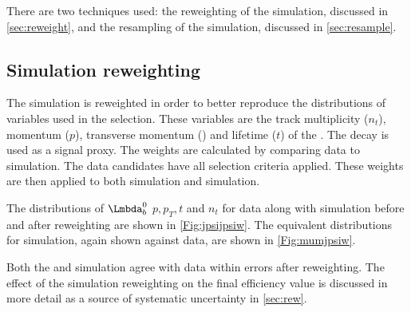 There are two techniques used: the reweighting of the simulation, discussed in \autoref{sec:reweight}, and the resampling of the simulation, discussed in \autoref{sec:resample}.

\subsection{Simulation reweighting}
\label{sec:reweight}
The simulation is reweighted in order to better reproduce the distributions of variables used in the selection. These variables are the track multiplicity ($n_{t}$), momentum ($p$), transverse momentum (\pt) and lifetime ($t$) of the \Lb. The \Lbpijpsi decay is used as a signal proxy. The weights are calculated by comparing \Lbpijpsi data to \Lbpijpsi simulation. The \Lbpijpsi data candidates have all selection criteria applied. These weights are then applied to both \Lbpijpsi simulation and \Lbpi simulation.


The distributions of $\Lb$ $p, p_{T}, t$ and $n_{t}$ for \Lbpijpsi data along with \Lbpijpsi simulation before and after reweighting are shown in \autoref{Fig:jpsijpsiw}.  The equivalent distributions for \Lbpi simulation, again shown against \Lbpijpsi data, are shown in \autoref{Fig:mumjpsiw}. %

Both the \Lbpi and \Lbpijpsi simulation agree with \Lbpijpsi data within errors after reweighting. The effect of the simulation reweighting on the final efficiency value is discussed in more detail as a source of systematic uncertainty in \autoref{sec:rew}.



